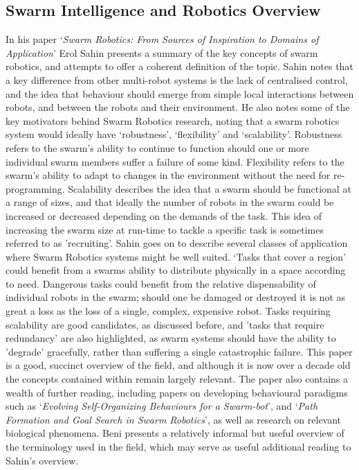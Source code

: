 \documentclass[titlepage,hidelinks,10pt]{article}
\begin{document}
\subsection{Swarm Intelligence and Robotics Overview} \label{GeneralSR}
In his paper `\textit{Swarm Robotics: From Sources of Inspiration to Domains of Application}' Erol Sahin presents a summary of the key concepts of swarm robotics\cite{InspirationToApplication}, and attempts to offer a coherent definition of the topic. Sahin notes that a key difference from other multi-robot systems is the lack of centralised control, and the idea that behaviour should emerge from simple local interactions between robots, and between the robots and their environment. He also notes some of the key motivators behind Swarm Robotics research, noting that a swarm robotics system would ideally have `robustness', `flexibility' and `scalability'. Robustness refers to the swarm's ability to continue to function should one or more individual swarm members suffer a failure of some kind. Flexibility refers to the swarm's ability to adapt to changes in the environment without the need for re-programming. Scalability describes the idea that a swarm should be functional at a range of sizes, and that ideally the number of robots in the swarm could be increased or decreased depending on the demands of the task. This idea of increasing the swarm size at run-time to tackle a specific task is sometimes referred to as 'recruiting'\cite{Recruiting}. Sahin goes on to describe several classes of application where Swarm Robotics systems might be well suited. `Tasks that cover a region' could benefit from a swarms ability to distribute physically in a space according to need. Dangerous tasks could benefit from the relative dispensability of individual robots in the swarm; should one be damaged or destroyed it is not as great a loss as the loss of a single, complex, expensive robot. Tasks requiring scalability are good candidates, as discussed before, and 'tasks that require redundancy' are also highlighted, as swarm systems should have the ability to 'degrade' gracefully, rather than suffering a single catastrophic failure. This paper is a good, succinct overview of the field, and although it is now over a decade old the concepts contained within remain largely relevant. The paper also contains a wealth of further reading, including papers on developing behavioural paradigms such as `\textit{Evolving Self-Organizing Behaviours for a Swarm-bot}\cite{SelfOrganizing}', and `\textit{Path Formation and Goal Search in Swarm Robotics}\cite{PathFormation}', as well as research on relevant biological phenomena\cite{BacterialSelfOrganization}. Beni presents a relatively informal but useful overview of the terminology used in the field\cite{FromSIToSR}, which may serve as useful additional reading to Sahin's overview.
\end{document}
